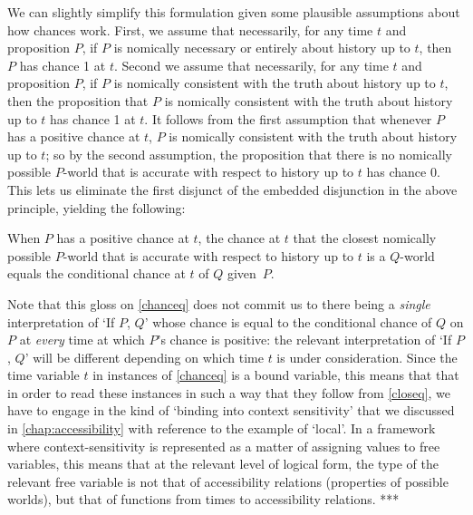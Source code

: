\documentclass[If.tex]{subfiles}
\begin{document}
We can slightly simplify this formulation given some plausible assumptions about how chances work.  First, we assume that necessarily, for any time $t$ and proposition $P$, if $P$ is nomically necessary or entirely about history up to $t$, then $P$ has chance 1 at $t$.  Second we assume that necessarily, for any time $t$ and proposition $P$, if $P$ is nomically consistent with the truth about history up to $t$, then the proposition that $P$ is nomically consistent with the truth about history up to $t$ has chance 1 at $t$.  It follows from the first assumption that whenever $P$ has a positive chance at $t$, $P$ is nomically consistent with the truth about history up to $t$; so by the second assumption, the proposition that there is no nomically possible $P$-world that is accurate with respect to history up to $t$ has chance 0.  This lets us eliminate the first disjunct of the embedded disjunction in the above principle, yielding the following:  
\begin{prop}
	\litem[Chance-Eq] \label{closeq}
	When $P$ has a positive chance at $t$, the chance at $t$ that the closest nomically possible $P$-world that is accurate with respect to history up to $t$ is a $Q$-world equals the conditional chance at $t$ of $Q$ given~$P$.	
\end{prop}

Note that this gloss on \ref{chanceq} does not commit us to there being a \emph{single} interpretation of ‘If $P$, $Q$’ whose chance is equal to the conditional chance of $Q$ on $P$ at \emph{every} time at which $P$'s chance is positive: the relevant interpretation of ‘If $P$, $Q$’ will be different depending on which time $t$ is under consideration.  Since the time variable $t$ in instances of \ref{chanceq} is a bound variable, this means that that in order to read these instances in such a way that they follow from \ref{closeq}, we have to engage in the kind of ‘binding into context sensitivity’ that we discussed in \autoref{chap:accessibility} with reference to the example of ‘local’.  In a framework where context-sensitivity is represented as a matter of assigning values to free variables, this means that at the relevant level of logical form, the type of the relevant free variable is not that of accessibility relations (properties of possible worlds), but that of functions from times to accessibility relations.  ***

\end{document}
